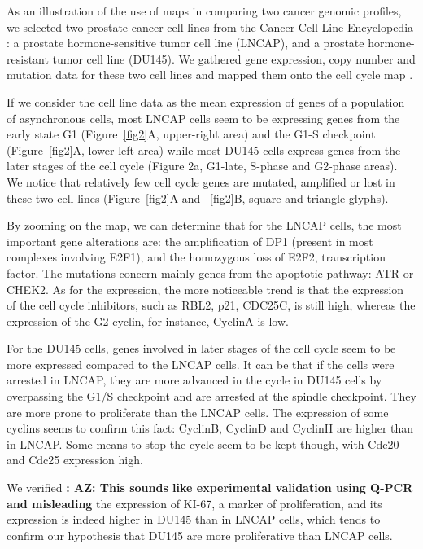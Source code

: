 \documentclass[a4,center,fleqn]{NAR}
\begin{document}
As an illustration of the use of maps in comparing two cancer genomic profiles, we
selected two prostate cancer cell lines from the Cancer Cell Line Encyclopedia
\cite{barretina2012cancer}: a prostate hormone-sensitive
tumor cell line (LNCAP), and a prostate hormone-resistant tumor cell line
(DU145). We gathered gene expression, copy number and mutation data for
these two cell lines and mapped them onto the cell cycle map
\cite{calzone2008comprehensive}.

If we consider the cell line data as the mean expression of genes of a
population of asynchronous cells, most LNCAP cells seem to be expressing genes
from the early state G1 (Figure~\ref{fig2}A, upper-right area) and the G1-S checkpoint
(Figure~\ref{fig2}A, lower-left area) while most DU145 cells express genes from the
later stages of the cell cycle (Figure 2a, G1-late, S-phase and G2-phase
areas).  We notice that relatively few cell cycle genes are mutated, amplified or lost
in these two cell lines (Figure~\ref{fig2}A and ~\ref{fig2}B, square and triangle glyphs).

By zooming on the map, we can determine that for the LNCAP cells, the most
important gene alterations are: the amplification of DP1 (present in most
complexes involving E2F1), and the homozygous loss of E2F2, transcription
factor. The mutations concern mainly genes from the apoptotic pathway: ATR or
CHEK2. As for the expression, the more noticeable trend is that the expression
of the cell cycle inhibitors, such as RBL2, p21, CDC25C, is still high, whereas
the expression of the G2 cyclin, for instance, CyclinA is low.

For the DU145 cells, genes involved in later stages of the cell cycle seem to
be more expressed compared to the LNCAP cells. It can be that if the cells were
arrested in LNCAP, they are more advanced in the cycle in DU145 cells by
overpassing the G1/S checkpoint and are arrested at the spindle checkpoint.
They are more prone to proliferate than the LNCAP cells. The expression of some
cyclins seems to confirm this fact: CyclinB, CyclinD and CyclinH are higher
than in LNCAP. Some means to stop the cycle seem to be kept though, with Cdc20
and Cdc25 expression high.

We verified {\bf: AZ: This sounds like experimental validation using Q-PCR and misleading}
the expression of KI-67, a marker of proliferation, and its
expression is indeed higher in DU145 than in LNCAP cells, which tends to
confirm our hypothesis that DU145 are more proliferative than LNCAP cells.
\end{document}

